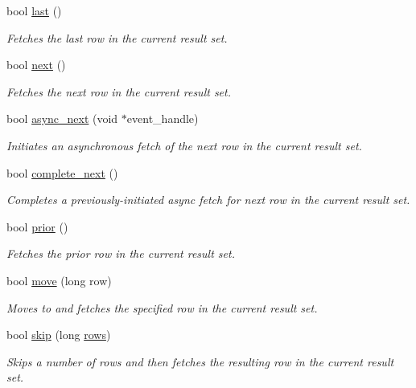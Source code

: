\begin{DoxyCompactItemize}
bool \mbox{\hyperlink{classnanodbc_1_1result_a5078a998be38e7814338597eaf100405}{last}} ()
\begin{DoxyCompactList}\small\item\em Fetches the last row in the current result set. \end{DoxyCompactList}\item 
bool \mbox{\hyperlink{classnanodbc_1_1result_a31470b51f194181373e4c2c4292d11c4}{next}} ()
\begin{DoxyCompactList}\small\item\em Fetches the next row in the current result set. \end{DoxyCompactList}\item 
bool \mbox{\hyperlink{classnanodbc_1_1result_a8c690c95797a04a6ea022e64867d0f53}{async\+\_\+next}} (void $\ast$event\+\_\+handle)
\begin{DoxyCompactList}\small\item\em Initiates an asynchronous fetch of the next row in the current result set. \end{DoxyCompactList}\item 
bool \mbox{\hyperlink{classnanodbc_1_1result_a0af2da5efc2576da4d2b2b54e340e11c}{complete\+\_\+next}} ()
\begin{DoxyCompactList}\small\item\em Completes a previously-\/initiated async fetch for next row in the current result set. \end{DoxyCompactList}\item 
bool \mbox{\hyperlink{classnanodbc_1_1result_afd0b71a0bfe3e184f3b9a1caf8f17058}{prior}} ()
\begin{DoxyCompactList}\small\item\em Fetches the prior row in the current result set. \end{DoxyCompactList}\item 
bool \mbox{\hyperlink{classnanodbc_1_1result_a70388a8ca569a6e30367a45f215f2986}{move}} (long row)
\begin{DoxyCompactList}\small\item\em Moves to and fetches the specified row in the current result set. \end{DoxyCompactList}\item 
bool \mbox{\hyperlink{classnanodbc_1_1result_abcd96eb3fd8fea53fa41289c5fc87377}{skip}} (long \mbox{\hyperlink{classnanodbc_1_1result_a7138ae9ec911fd4694a5c81ef902db89}{rows}})
\begin{DoxyCompactList}\small\item\em Skips a number of rows and then fetches the resulting row in the current result set. \end{DoxyCompactList}\item 

\end{DoxyCompactItemize}
